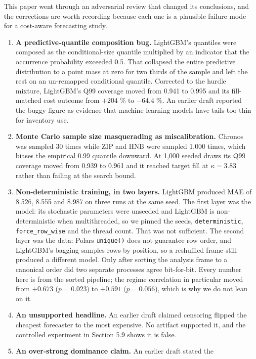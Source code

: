 \documentclass[11pt]{article}
\begin{document}
This paper went through an adversarial review that changed its conclusions, and
the corrections are worth recording because each one is a plausible failure
mode for a cost-aware forecasting study.

\begin{enumerate}
\item \textbf{A predictive-quantile composition bug.} LightGBM's quantiles were
  composed as the conditional-size quantile multiplied by an indicator that the
  occurrence probability exceeded 0.5. That collapsed the entire predictive
  distribution to a point mass at zero for two thirds of the sample and left
  the rest on an un-remapped conditional quantile. Corrected to the hurdle
  mixture, LightGBM's Q99 coverage moved from 0.941 to 0.995 and its
  fill-matched cost outcome from $+204$ \% to $-64.4$ \%. An earlier draft
  reported the buggy figure as evidence that machine-learning models have tails
  too thin for inventory use.
\item \textbf{Monte Carlo sample size masquerading as miscalibration.} Chronos
  was sampled 30 times while ZIP and HNB were sampled 1{,}000 times, which
  biases the empirical 0.99 quantile downward. At 1{,}000 seeded draws its Q99
  coverage moved from 0.939 to 0.961 and it reached target fill at
  $\kappa = 3.83$ rather than failing at the search bound.
\item \textbf{Non-deterministic training, in two layers.} LightGBM produced
  MAE of 8.526, 8.555 and 8.987 on three runs at the same seed. The first layer
  was the model: its stochastic parameters were unseeded and LightGBM is
  non-deterministic when multithreaded, so we pinned the seeds,
  \texttt{deterministic}, \texttt{force\_row\_wise} and the thread count. That
  was not sufficient. The second layer was the data: Polars \texttt{unique()}
  does not guarantee row order, and LightGBM's bagging samples rows by
  position, so a reshuffled frame still produced a different model. Only after
  sorting the analysis frame to a canonical order did two separate processes
  agree bit-for-bit. Every number here is from the sorted pipeline; the regime
  correlation in particular moved from $+0.673$ ($p = 0.023$) to $+0.591$
  ($p = 0.056$), which is why we do not lean on it.
\item \textbf{An unsupported headline.} An earlier draft claimed censoring
  flipped the cheapest forecaster to the most expensive. No artifact supported
  it, and the controlled experiment in Section 5.9 shows it is false.
\item \textbf{An over-strong dominance claim.} An earlier draft stated the

\end{enumerate}
\end{document}
